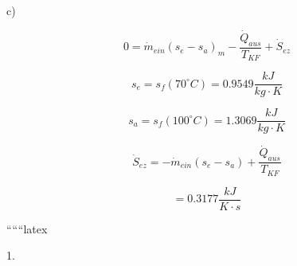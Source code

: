 c)

\[
0 = \dot{m}_{ein} (s_e - s_a)_{m} - \frac{\dot{Q}_{aus}}{T_{KF}} + \dot{S}_{ez}
\]

\[
s_e = s_f (70^\circ C) = 0.9549 \frac{kJ}{kg \cdot K}
\]

\[
s_a = s_f (100^\circ C) = 1.3069 \frac{kJ}{kg \cdot K}
\]

\[
\dot{S}_{ez} = -\dot{m}_{ein} (s_e - s_a) + \frac{\dot{Q}_{aus}}{T_{KF}}
\]

\[
= 0.3177 \frac{kJ}{K \cdot s}
\]

``````latex

1.